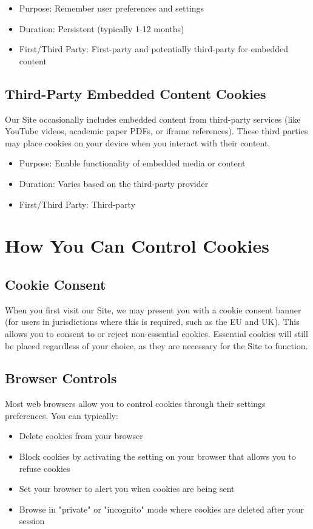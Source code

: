 \documentclass[11pt]{article}
\begin{document}
\begin{itemize}
  \item Purpose: Remember user preferences and settings
  \item Duration: Persistent (typically 1-12 months)
  \item First/Third Party: First-party and potentially third-party for embedded content
\end{itemize}

\subsection{Third-Party Embedded Content Cookies}
Our Site occasionally includes embedded content from third-party services (like YouTube videos, academic paper PDFs, or iframe references). These third parties may place cookies on your device when you interact with their content.

\begin{itemize}
  \item Purpose: Enable functionality of embedded media or content
  \item Duration: Varies based on the third-party provider
  \item First/Third Party: Third-party
\end{itemize}

\section{How You Can Control Cookies}

\subsection{Cookie Consent}
When you first visit our Site, we may present you with a cookie consent banner (for users in jurisdictions where this is required, such as the EU and UK). This allows you to consent to or reject non-essential cookies. Essential cookies will still be placed regardless of your choice, as they are necessary for the Site to function.

\subsection{Browser Controls}
Most web browsers allow you to control cookies through their settings preferences. You can typically:

\begin{itemize}
  \item Delete cookies from your browser
  \item Block cookies by activating the setting on your browser that allows you to refuse cookies
  \item Set your browser to alert you when cookies are being sent
  \item Browse in "private" or "incognito" mode where cookies are deleted after your session
\end{itemize}
\end{document}
